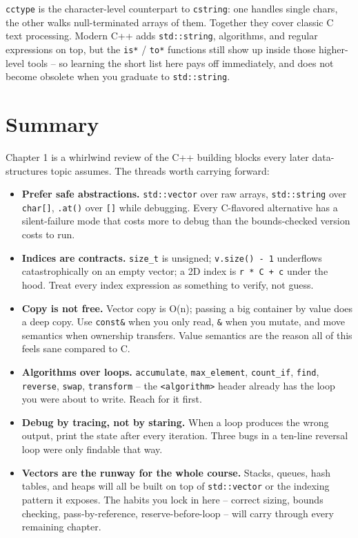\documentclass[11pt]{article}
\begin{document}
\begin{ideabox}
\texttt{cctype} is the character-level counterpart to \texttt{cstring}:
one handles single chars, the other walks null-terminated arrays of
them. Together they cover classic C text processing. Modern C++ adds
\texttt{std::string}, algorithms, and regular expressions on top, but
the \texttt{is*} / \texttt{to*} functions still show up inside those
higher-level tools -- so learning the short list here pays off
immediately, and does not become obsolete when you graduate to
\texttt{std::string}.
\end{ideabox}

\section*{Summary}

Chapter 1 is a whirlwind review of the C++ building blocks every later
data-structures topic assumes. The threads worth carrying forward:

\begin{itemize}[leftmargin=*]
    \item \textbf{Prefer safe abstractions.} \texttt{std::vector} over
    raw arrays, \texttt{std::string} over \texttt{char[]}, \texttt{.at()}
    over \texttt{[]} while debugging. Every C-flavored alternative has
    a silent-failure mode that costs more to debug than the
    bounds-checked version costs to run.
    \item \textbf{Indices are contracts.} \texttt{size\_t} is unsigned;
    \texttt{v.size() - 1} underflows catastrophically on an empty
    vector; a 2D index is \texttt{r * C + c} under the hood. Treat
    every index expression as something to verify, not guess.
    \item \textbf{Copy is not free.} Vector copy is O(n); passing a big
    container by value does a deep copy. Use \texttt{const\&} when you
    only read, \texttt{\&} when you mutate, and move semantics when
    ownership transfers. Value semantics are the reason all of this
    feels sane compared to C.
    \item \textbf{Algorithms over loops.} \texttt{accumulate},
    \texttt{max\_element}, \texttt{count\_if}, \texttt{find},
    \texttt{reverse}, \texttt{swap}, \texttt{transform} -- the
    \texttt{<algorithm>} header already has the loop you were about to
    write. Reach for it first.
    \item \textbf{Debug by tracing, not by staring.} When a loop
    produces the wrong output, print the state after every iteration.
    Three bugs in a ten-line reversal loop were only findable that way.
    \item \textbf{Vectors are the runway for the whole course.} Stacks,
    queues, hash tables, and heaps will all be built on top of
    \texttt{std::vector} or the indexing pattern it exposes. The
    habits you lock in here -- correct sizing, bounds checking,
    pass-by-reference, reserve-before-loop -- will carry through
    every remaining chapter.
\end{itemize}
\end{document}
